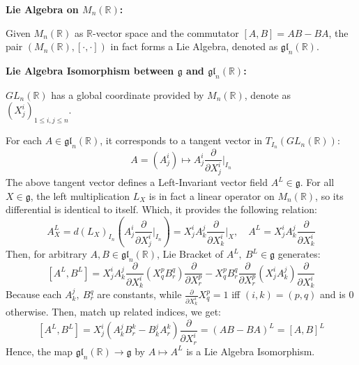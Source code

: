\documentclass[20pt,margin=0.9in,innermargin=-4.5in,blockverticalspace=-0.25in]{tikzposter}
\begin{document}
\begin{columns}
{\begin{exampleBox}
            \textbf{Lie Algebra on $M_n(\mathbb{R})$:}

            Given $M_n(\mathbb{R})$ as $\mathbb{R}$-vector space and the commutator $[A,B]=AB-BA$, the pair $(M_n(\mathbb{R}),[\cdot,\cdot])$ in fact forms a Lie Algebra, denoted as $\mathfrak{gl}_n(\mathbb{R})$.

            

            \hfil

            \textbf{Lie Algebra Isomorphism between $\mathfrak{g}$ and $\mathfrak{gl}_n(\mathbb{R})$:}

            $GL_n(\mathbb{R})$ has a global coordinate provided by $M_n(\mathbb{R})$, denote as $(X^i_j)_{1\leq i,j\leq n}$.
            
            For each $A\in \mathfrak{gl}_n(\mathbb{R})$, it corresponds to a tangent vector in $T_{I_n}(GL_n(\mathbb{R}))$:
            $$A = (A^i_j)\mapsto A^i_j\frac{\partial}{\partial X^i_j}\bigg|_{I_n}$$
            The above tangent vector defines a Left-Invariant vector field $A^L\in \mathfrak{g}$. For all $X\in \mathfrak{g}$, the left multiplication $L_X$ is in fact a linear operator on $M_n(\mathbb{R})$, so its differential is identical to itself. Which, it provides the following relation:
            $$A^L_X=d(L_X)_{I_n}\left(A^i_j\frac{\partial}{\partial X^i_j}\bigg|_{I_n}\right) = X^i_j A^j_k\frac{\partial}{\partial X^i_k}\bigg|_{X},\quad A^L=X^i_j A^j_k\frac{\partial}{\partial X^i_k}$$
            Then, for arbitrary $A,B\in\mathfrak{gl}_n(\mathbb{R})$, Lie Bracket of $A^L,\ B^L\in\mathfrak{g}$ generates:
            $$\left[A^L,B^L\right] = X^i_jA^j_k\frac{\partial}{\partial X^i_k}(X^p_qB^q_r)\frac{\partial}{\partial X^p_r}-X^p_qB^q_r\frac{\partial}{\partial X^p_r}(X^i_jA^j_k)\frac{\partial}{\partial X^i_k}$$
            Because each $A^j_k,\ B^q_r$ are constants, while $\frac{\partial}{\partial X^i_k}X^p_q = 1$ iff $(i,k)=(p,q)$ and is $0$ otherwise. Then, match up related indices, we get:
            $$\left[A^L,B^L\right] = X^i_j(A^j_kB^k_r-B^j_kA^k_r)\frac{\partial}{\partial X^i_r} = (AB-BA)^L=[A,B]^L$$
            Hence, the map $\mathfrak{gl}_n(\mathbb{R})\rightarrow \mathfrak{g}$ by $A\mapsto A^L$ is a Lie Algebra Isomorphism.
        \end{exampleBox}
    }

\end{columns}
\end{document}

